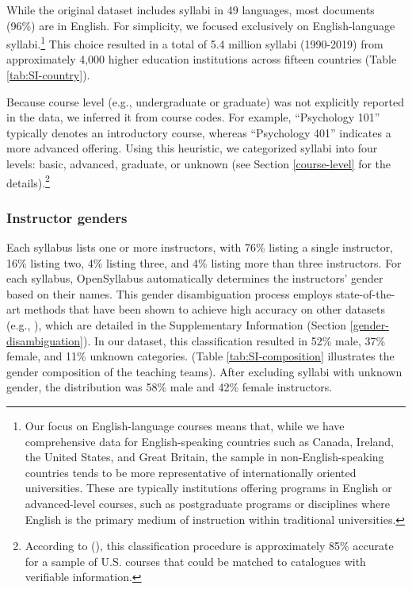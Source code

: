 \documentclass[
  11pt,
]{article}
\begin{document}
While the original dataset includes syllabi in 49 languages, most documents (96\%) are in English. For simplicity, we focused exclusively on English-language syllabi.\footnote{
  Our focus on English-language courses means that, while we have comprehensive data for English-speaking countries such as Canada, Ireland, the United States, and Great Britain, the sample in non-English-speaking countries tends to be more representative of internationally oriented universities. These are typically institutions offering programs in English or advanced-level courses, such as postgraduate programs or disciplines where English is the primary medium of instruction within traditional universities.} This choice resulted in a total of 5.4 million syllabi (1990-2019) from approximately 4,000 higher education institutions across fifteen countries (Table \ref{tab:SI-country}).

Because course level (e.g., undergraduate or graduate) was not explicitly reported in the data, we inferred it from course codes. For example, ``Psychology 101'' typically denotes an introductory course, whereas ``Psychology 401'' indicates a more advanced offering. Using this heuristic, we categorized syllabi into four levels: basic, advanced, graduate, or unknown (see Section \ref{course-level} for the details).\footnote{
  According to (), this classification procedure is approximately 85\% accurate for a sample of U.S. courses that could be matched to catalogues with verifiable information.}

\subsubsection{Instructor genders}\label{instructor-genders}

Each syllabus lists one or more instructors, with 76\% listing a single instructor, 16\% listing two, 4\% listing three, and 4\% listing more than three instructors. For each syllabus, OpenSyllabus automatically determines the instructors' gender based on their names. This gender disambiguation process employs state-of-the-art methods that have been shown to achieve high accuracy on other datasets (e.g., ), which are detailed in the Supplementary Information (Section \ref{gender-disambiguation}). In our dataset, this classification resulted in 52\% male, 37\% female, and 11\% unknown categories. (Table \ref{tab:SI-composition} illustrates the gender composition of the teaching teams). After excluding syllabi with unknown gender, the distribution was 58\% male and 42\% female instructors.
\end{document}
